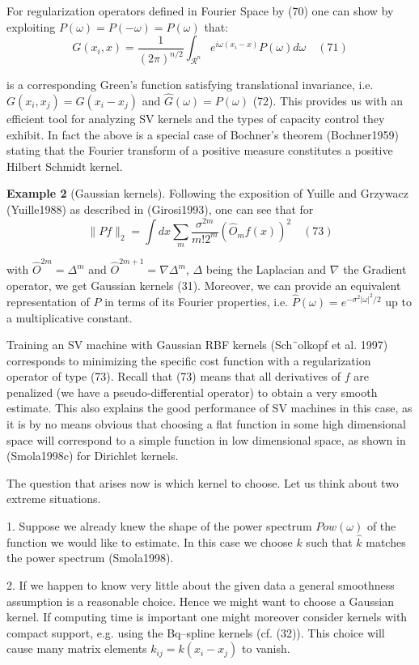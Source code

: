 \documentclass[fleqn,10pt]{olplainarticle}
\begin{document}
For regularization operators defined in Fourier Space by (70) one can show by exploiting \({P}(\omega) = {P}(-\omega) = {P}(\omega)\) that:
\[
G(x_i, x) = \frac{1}{{(2\pi)^{n/2}}} \int_{\mathcal{R}^n} e^{i\omega(x_i - x)}{P}(\omega) d\omega \quad (71)
\]

is a corresponding Green’s function satisfying translational invariance, i.e. \(G(x_i, x_j) = G(x_i - x_j)\) and \(\hat{G}(\omega) = {P}(\omega)\) (72). This provides us with an efficient tool for analyzing SV kernels and the types of capacity control they exhibit. In fact the above is a special case of Bochner’s theorem (Bochner1959) stating that the Fourier transform of a positive measure constitutes a positive Hilbert Schmidt kernel.

\textbf{Example 2} (Gaussian kernels). Following the exposition of Yuille and Grzywacz (Yuille1988) as described in (Girosi1993), one can see that for
\[
\|P f \|_2 = \int dx \sum_{m} \frac{\sigma^{2m}}{m!2^m} (\hat{O}_m f(x))^2 \quad (73)
\]

with \(\hat{O}^{2m} = \Delta^m\) and \(\hat{O}^{2m+1} = \nabla \Delta^m\), \(\Delta\) being the Laplacian and \(\nabla\) the Gradient operator, we get Gaussian kernels (31). Moreover, we can provide an equivalent representation of \(P\) in terms of its Fourier properties, i.e. \(\hat{P}(\omega) = e^{-\sigma^2|\omega|^2/2}\) up to a multiplicative constant.

Training an SV machine with Gaussian RBF kernels (Sch¨olkopf et al. 1997) corresponds to minimizing the specific cost function with a regularization operator of type (73). Recall that (73) means that all derivatives of \(f\) are penalized (we have a pseudo-differential operator) to obtain a very smooth estimate. This also explains the good performance of SV machines in this case, as it is by no means obvious that choosing a flat function in some high dimensional space will correspond to a simple function in low dimensional space, as shown in (Smola1998c) for Dirichlet kernels.

The question that arises now is which kernel to choose. Let us think about two extreme situations.

1. Suppose we already knew the shape of the power spectrum \(Pow(\omega)\) of the function we would like to estimate. In this case we choose \(k\) such that \(\hat{k}\) matches the power spectrum (Smola1998).

2. If we happen to know very little about the given data a general smoothness assumption is a reasonable choice. Hence we might want to choose a Gaussian kernel. If computing time is important one might moreover consider kernels with compact support, e.g. using the Bq–spline kernels (cf. (32)). This choice will cause many matrix elements \(k_{ij} = k(x_i-x_j)\) to vanish.
\end{document}
